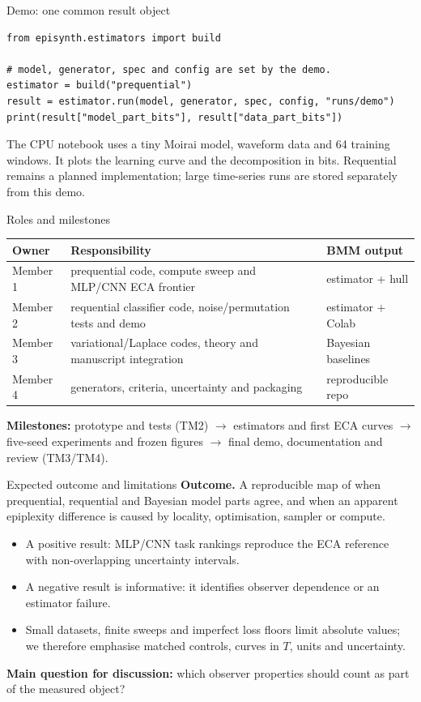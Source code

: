 \documentclass[aspectratio=43]{beamer}
\begin{document}
\begin{frame}[fragile]{Demo: one common result object}
\small
\begin{verbatim}
from episynth.estimators import build

# model, generator, spec and config are set by the demo.
estimator = build("prequential")
result = estimator.run(model, generator, spec, config, "runs/demo")
print(result["model_part_bits"], result["data_part_bits"])
\end{verbatim}

\medskip
The CPU notebook uses a tiny Moirai model, waveform data and 64 training windows.
It plots the learning curve and the decomposition in bits. Requential remains a planned
implementation; large time-series runs are stored separately from this demo.
\end{frame}

\begin{frame}{Roles and milestones}
\scriptsize
\begin{tabular}{p{.18\linewidth}p{.52\linewidth}p{.18\linewidth}}
\toprule
Owner & Responsibility & BMM output \\
\midrule
Member 1 & prequential code, compute sweep and MLP/CNN ECA frontier & estimator + hull \\
Member 2 & requential classifier code, noise/permutation tests and demo & estimator + Colab \\
Member 3 & variational/Laplace codes, theory and manuscript integration & Bayesian baselines \\
Member 4 & generators, criteria, uncertainty and packaging & reproducible repo \\
\bottomrule
\end{tabular}

\medskip
\textbf{Milestones:} prototype and tests (TM2) $\rightarrow$ estimators and first ECA curves
$\rightarrow$ five-seed experiments and frozen figures $\rightarrow$ final demo, documentation and review (TM3/TM4).
\end{frame}

\begin{frame}{Expected outcome and limitations}
\textbf{Outcome.} A reproducible map of when prequential, requential and Bayesian model parts agree,
and when an apparent epiplexity difference is caused by locality, optimisation, sampler or compute.

\medskip
\begin{itemize}
\item A positive result: MLP/CNN task rankings reproduce the ECA reference with non-overlapping
      uncertainty intervals.
\item A negative result is informative: it identifies observer dependence or an estimator failure.
\item Small datasets, finite sweeps and imperfect loss floors limit absolute values; we therefore
      emphasise matched controls, curves in $T$, units and uncertainty.
\end{itemize}

\medskip
\centering
\textbf{Main question for discussion:} which observer properties should count as part of the measured object?
\end{frame}
\end{document}
